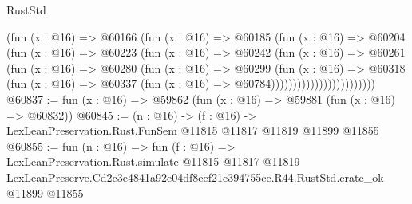 \begin{lexlean}{RustStd}
\begin{coremodule}
                              (fun (x : @16) =>
                              @60166
                                (fun (x : @16) =>
                                @60185
                                  (fun (x : @16) =>
                                  @60204
                                    (fun (x : @16) =>
                                    @60223
                                      (fun (x : @16) =>
                                      @60242
                                        (fun (x : @16) =>
                                        @60261
                                          (fun (x : @16) =>
                                          @60280
                                            (fun (x : @16) =>
                                            @60299
                                              (fun (x : @16) =>
                                              @60318
                                                (fun (x : @16) =>
                                                @60337
                                                  (fun (x : @16) => @60784))))))))))))))))))))))))
@60837 := fun (x : @16) => @59862 (fun (x : @16) => @59881 (fun (x : @16) => @60832))
@60845 := (n : @16) ->
  (f : @16) -> LexLeanPreservation.Rust.FunSem @11815 @11817 @11819 @11899 @11855
@60855 := fun (n : @16) =>
  fun (f : @16) =>
  LexLeanPreservation.Rust.simulate
    @11815
    @11817
    @11819
    LexLeanPreserve.Cd2c3e4841a92e04df8eef21e394755ce.R44.RustStd.crate_ok
    @11899
    @11855
\end{coremodule}
\end{lexlean}
